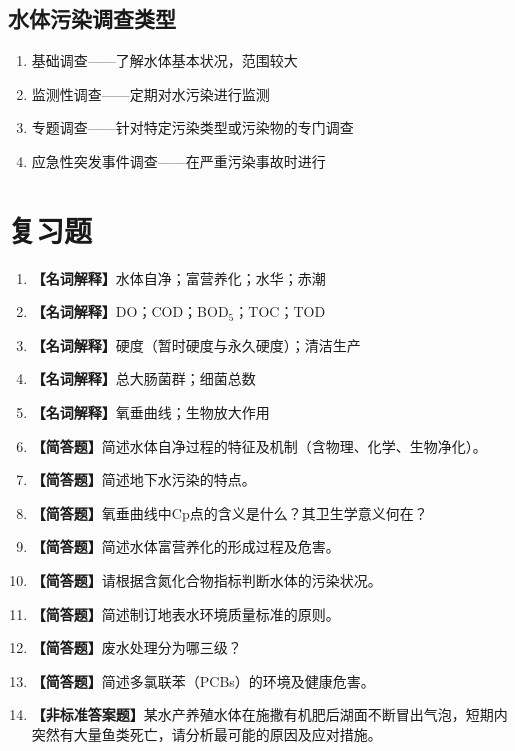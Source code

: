 \subsection{水体污染调查类型}
\begin{enumerate}[leftmargin=*]
    \item 基础调查——了解水体基本状况，范围较大
    \item 监测性调查——定期对水污染进行监测
    \item 专题调查——针对特定污染类型或污染物的专门调查
    \item 应急性突发事件调查——在严重污染事故时进行
\end{enumerate}

\section{复习题}

\begin{enumerate}[leftmargin=*, itemsep=8pt]
    \item \textbf{【名词解释】}水体自净；富营养化；水华；赤潮
    \item \textbf{【名词解释】}DO；COD；BOD$_5$；TOC；TOD
    \item \textbf{【名词解释】}硬度（暂时硬度与永久硬度）；清洁生产
    \item \textbf{【名词解释】}总大肠菌群；细菌总数
    \item \textbf{【名词解释】}氧垂曲线；生物放大作用
    \item \textbf{【简答题】}简述水体自净过程的特征及机制（含物理、化学、生物净化）。
    \item \textbf{【简答题】}简述地下水污染的特点。
    \item \textbf{【简答题】}氧垂曲线中Cp点的含义是什么？其卫生学意义何在？
    \item \textbf{【简答题】}简述水体富营养化的形成过程及危害。
    \item \textbf{【简答题】}请根据含氮化合物指标判断水体的污染状况。
    \item \textbf{【简答题】}简述制订地表水环境质量标准的原则。
    \item \textbf{【简答题】}废水处理分为哪三级？
    \item \textbf{【简答题】}简述多氯联苯（PCBs）的环境及健康危害。
    \item \textbf{【非标准答案题】}某水产养殖水体在施撒有机肥后湖面不断冒出气泡，短期内突然有大量鱼类死亡，请分析最可能的原因及应对措施。
\end{enumerate}

